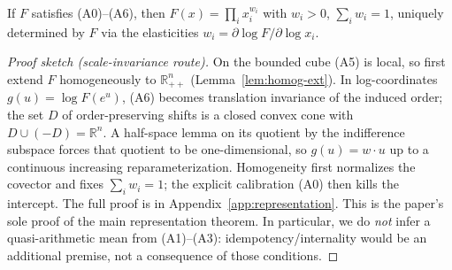 \begin{theorem}\label{thm:rep}
If $F$ satisfies \textup{(A0)--(A6)}, then $F(x)=\prod_i x_i^{w_i}$ with
$w_i>0$, $\sum_i w_i=1$, uniquely determined by $F$ via the elasticities
$w_i=\partial\log F/\partial\log x_i$.
\end{theorem}

\begin{proof}[Proof sketch (scale-invariance route)]
On the bounded cube (A5) is local, so first extend $F$ homogeneously to
$\mathbb{R}_{++}^n$ (Lemma~\ref{lem:homog-ext}). In log-coordinates
$g(u)=\log F(e^u)$, (A6) becomes translation invariance of the induced
order; the set $D$ of order-preserving shifts is a closed convex cone with
$D\cup(-D)=\mathbb{R}^n$. A half-space lemma on its quotient by the
indifference subspace forces that quotient to be one-dimensional, so
$g(u)=w\cdot u$ up to a continuous increasing reparameterization.
Homogeneity first normalizes the covector and fixes $\sum_iw_i=1$; the
explicit calibration (A0) then kills the intercept. The full proof
is in Appendix~\ref{app:representation}. This is the paper's sole proof of
the main representation theorem. In particular, we do \emph{not} infer a
quasi-arithmetic mean from (A1)--(A3): idempotency/internality would be an
additional premise, not a consequence of those conditions.
\end{proof}

